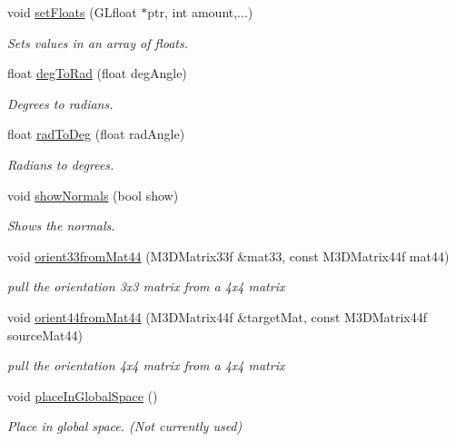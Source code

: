\begin{DoxyCompactItemize}
\item 
void \hyperlink{class_drawable_object_a80b73d61d96585ac55a840b9045d9e0f}{set\-Floats} (G\-Lfloat $\ast$ptr, int amount,...)
\begin{DoxyCompactList}\small\item\em Sets values in an array of floats. \end{DoxyCompactList}\item 
float \hyperlink{class_drawable_object_a131b461829d124aa96e195ff328f04e0}{deg\-To\-Rad} (float deg\-Angle)
\begin{DoxyCompactList}\small\item\em Degrees to radians. \end{DoxyCompactList}\item 
float \hyperlink{class_drawable_object_a4429a1562fb50a2fe3109a883275e010}{rad\-To\-Deg} (float rad\-Angle)
\begin{DoxyCompactList}\small\item\em Radians to degrees. \end{DoxyCompactList}\item 
void \hyperlink{class_drawable_object_a5b2d983aa42a382771032b87d0939845}{show\-Normals} (bool show)
\begin{DoxyCompactList}\small\item\em Shows the normals. \end{DoxyCompactList}\item 
void \hyperlink{class_drawable_object_a249dee84469279b20c24f75488ad5360}{orient33from\-Mat44} (M3\-D\-Matrix33f \&mat33, const M3\-D\-Matrix44f mat44)
\begin{DoxyCompactList}\small\item\em pull the orientation 3x3 matrix from a 4x4 matrix \end{DoxyCompactList}\item 
void \hyperlink{class_drawable_object_a145377e8576bfc735a7114c88ba9a8e8}{orient44from\-Mat44} (M3\-D\-Matrix44f \&target\-Mat, const M3\-D\-Matrix44f source\-Mat44)
\begin{DoxyCompactList}\small\item\em pull the orientation 4x4 matrix from a 4x4 matrix \end{DoxyCompactList}\item 
void \hyperlink{class_drawable_object_a7b21d883679921d5920512c6435c5bf6}{place\-In\-Global\-Space} ()
\begin{DoxyCompactList}\small\item\em Place in global space. (Not currently used) \end{DoxyCompactList}\end{DoxyCompactItemize}
